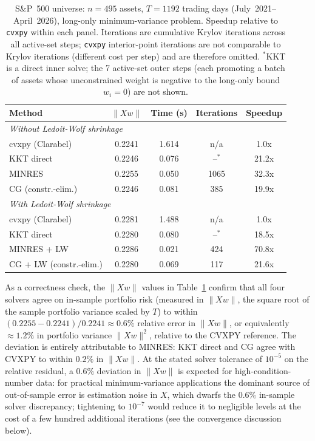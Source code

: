 \documentclass{siam/siamart}
\begin{document}
\begin{table}[ht]
\centering
\begin{tabular}{lcccc}
\toprule
Method & $\|Xw\|$ & Time (s) & Iterations & Speedup \\
\midrule
\multicolumn{5}{l}{\textit{Without Ledoit-Wolf shrinkage}} \\[2pt]
cvxpy (Clarabel)                    & 0.2241 & 1.614 &  n/a &  1.0x \\
KKT direct                          & 0.2246 & 0.076 & --$^*$ & 21.2x \\
MINRES                              & 0.2255 & 0.050 & 1065 & 32.3x \\
CG (constr.-elim.)                  & 0.2246 & 0.081 &  385 & 19.9x \\
\midrule
\multicolumn{5}{l}{\textit{With Ledoit-Wolf shrinkage}} \\[2pt]
cvxpy (Clarabel)                    & 0.2281 & 1.488 &  n/a &  1.0x \\
KKT direct                          & 0.2280 & 0.080 & --$^*$ & 18.5x \\
MINRES + LW                         & 0.2286 & 0.021 &  424 & 70.8x \\
CG + LW (constr.-elim.)             & 0.2280 & 0.069 &  117 & 21.6x \\
\bottomrule
\end{tabular}
\caption{S\&P~500 universe: $n=495$ assets, $T=1192$ trading days
(July~2021--April~2026), long-only minimum-variance problem.
Speedup relative to \texttt{cvxpy} within each panel.
Iterations are cumulative Krylov iterations across all active-set steps;
\texttt{cvxpy} interior-point iterations are not comparable to Krylov iterations
(different cost per step) and are therefore omitted.
$^*$KKT is a direct inner solve; the 7 active-set outer steps (each promoting a batch
of assets whose unconstrained weight is negative to the long-only bound $w_i = 0$)
are not shown.}
\label{tab:sp500}
\end{table}

As a correctness check, the $\|Xw\|$ values in Table~\ref{tab:sp500} confirm
that all four solvers agree on in-sample portfolio risk (measured in $\|Xw\|$,
the square root of the sample portfolio variance scaled by $T$) to within
$(0.2255 - 0.2241)/0.2241 \approx 0.6\%$ relative error in $\|Xw\|$, or
equivalently $\approx 1.2\%$ in portfolio variance $\|Xw\|^2$, relative to
the CVXPY reference.  The deviation is entirely attributable to MINRES: KKT
direct and CG agree with CVXPY to within $0.2\%$ in $\|Xw\|$.  At the stated
solver tolerance of $10^{-5}$ on the relative residual, a $0.6\%$ deviation in
$\|Xw\|$ is expected for high-condition-number data: for practical minimum-variance
applications the dominant source of out-of-sample error is estimation noise in $X$,
which dwarfs the $0.6\%$ in-sample solver discrepancy; tightening to $10^{-7}$
would reduce it to negligible levels at the cost of a few hundred additional
iterations (see the convergence discussion below).
\end{document}
